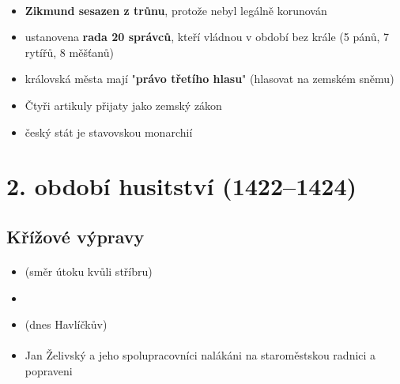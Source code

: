 \paragraph{}
\begin{itemize}
\item \textbf{Zikmund sesazen z trůnu}, protože nebyl legálně korunován
\item ustanovena \textbf{rada 20 správců}, kteří vládnou v období bez krále (5 pánů, 7 rytířů, 8 měšťanů)
\item královská města mají "\textbf{právo třetího hlasu}" (hlasovat na zemském sněmu)
\item Čtyři artikuly přijaty jako zemský zákon
\item[\ra] český stát je stavovskou monarchií
\end{itemize}


\section{2. období husitství (1422--1424)}
\subsection{Křížové výpravy}
\paragraph{}
\begin{itemize}
\item {} (směr útoku kvůli stříbru)
\item {}
\item {} (dnes Havlíčkův)
\end{itemize}

\paragraph{}
\begin{itemize}
\item Jan Želivský a jeho spolupracovníci nalákáni na staroměstskou radnici a popraveni
\end{itemize}

